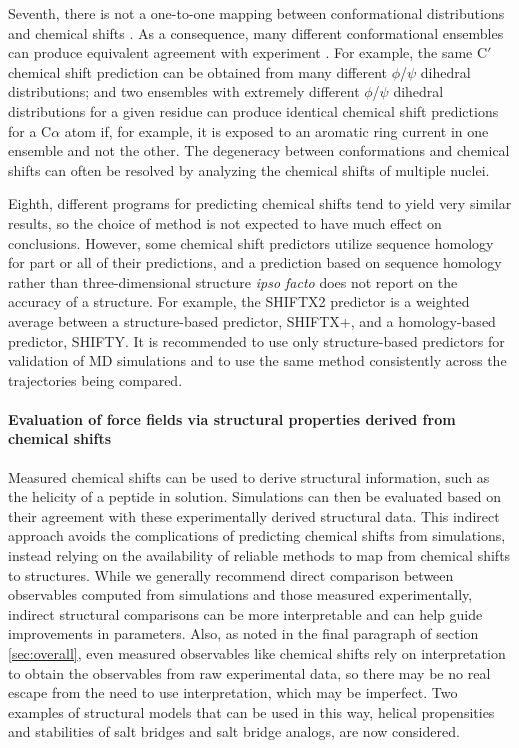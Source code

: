 \documentclass[9pt,review,pubversion]{livecoms}
\begin{document}
Seventh, there is not a one-to-one mapping between conformational distributions and chemical shifts \cite{ozenne2012mapping}. As a consequence, many different conformational ensembles can produce equivalent agreement with experiment \cite{wood_secondary_2011,virtanen_heterogeneous_2020,shrestha_full_2021}.
For example, the same C$'$ chemical shift prediction can be obtained from many different $\phi$/$\psi$ dihedral distributions; and two ensembles with extremely different $\phi$/$\psi$ dihedral distributions for a given residue can produce identical chemical shift predictions for a C$\alpha$ atom if, for example, it is exposed to an aromatic ring current in one ensemble and not the other.
The degeneracy between conformations and chemical shifts can often be resolved by analyzing the chemical shifts of multiple nuclei.

Eighth, different programs for predicting chemical shifts tend to yield very similar results, so the choice of method is not expected to have much effect on conclusions.
However, some chemical shift predictors utilize sequence homology for part or all of their predictions, and a prediction based on sequence homology rather than three-dimensional structure \emph{ipso facto} does not report on the accuracy of a structure.
For example, the SHIFTX2 predictor is a weighted average between a structure-based predictor, SHIFTX+, and a homology-based predictor, SHIFTY.
It is recommended to use only structure-based predictors for validation of MD simulations and to use the same method consistently across the trajectories being compared.

\paragraph{Evaluation of force fields via structural properties derived from chemical shifts}
\label{sub3:derived-chemical-shifts}

Measured chemical shifts can be used to derive structural information, such as the helicity of a peptide in solution.
Simulations can then be evaluated based on their agreement with these experimentally derived structural data.
This indirect approach avoids the complications of predicting chemical shifts from simulations, instead relying on the availability of reliable methods to map from chemical shifts to structures.
While we generally recommend direct comparison between observables computed from simulations and those measured experimentally, indirect structural comparisons can be more interpretable and can help guide improvements in parameters.
Also, as noted in the final paragraph of section \ref{sec:overall}, even measured observables like chemical shifts rely on interpretation to obtain the observables from raw experimental data, so there may be no real escape from the need to use interpretation, which may be imperfect.
Two examples of structural models that can be used in this way, helical propensities and stabilities of salt bridges and salt bridge analogs, are now considered.
\end{document}
